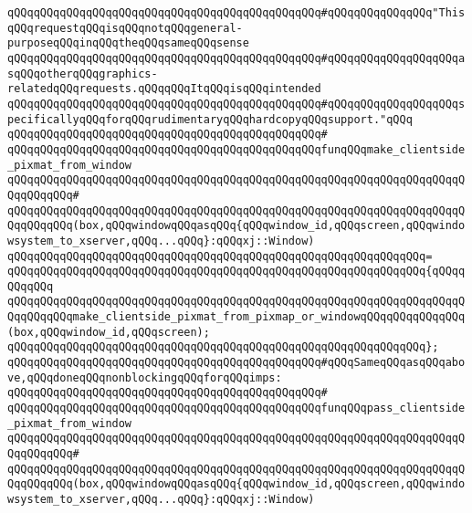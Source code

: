 \verb|qQQqqQQqqQQqqQQqqQQqqQQqqQQqqQQqqQQqqQQqqQQqqQQq#qQQqqQQqqQQqqQQq"ThisqQQqrequestqQQqisqQQqnotqQQqgeneral-purposeqQQqinqQQqtheqQQqsameqQQqsense|\newline
\verb|qQQqqQQqqQQqqQQqqQQqqQQqqQQqqQQqqQQqqQQqqQQqqQQq#qQQqqQQqqQQqqQQqqQQqasqQQqotherqQQqgraphics-relatedqQQqrequests.qQQqqQQqItqQQqisqQQqintended|\newline
\verb|qQQqqQQqqQQqqQQqqQQqqQQqqQQqqQQqqQQqqQQqqQQqqQQq#qQQqqQQqqQQqqQQqqQQqspecificallyqQQqforqQQqrudimentaryqQQqhardcopyqQQqsupport."qQQq|\newline
\verb|qQQqqQQqqQQqqQQqqQQqqQQqqQQqqQQqqQQqqQQqqQQqqQQq#|\newline
\verb|qQQqqQQqqQQqqQQqqQQqqQQqqQQqqQQqqQQqqQQqqQQqqQQqfunqQQqmake_clientside_pixmat_from_window|\newline
\verb|qQQqqQQqqQQqqQQqqQQqqQQqqQQqqQQqqQQqqQQqqQQqqQQqqQQqqQQqqQQqqQQqqQQqqQQqqQQqqQQq#|\newline
\verb|qQQqqQQqqQQqqQQqqQQqqQQqqQQqqQQqqQQqqQQqqQQqqQQqqQQqqQQqqQQqqQQqqQQqqQQqqQQqqQQq(box,qQQqwindowqQQqasqQQq{qQQqwindow_id,qQQqscreen,qQQqwindowsystem_to_xserver,qQQq...qQQq}:qQQqxj::Window)|\newline
\verb|qQQqqQQqqQQqqQQqqQQqqQQqqQQqqQQqqQQqqQQqqQQqqQQqqQQqqQQqqQQqqQQq=|\newline
\verb|qQQqqQQqqQQqqQQqqQQqqQQqqQQqqQQqqQQqqQQqqQQqqQQqqQQqqQQqqQQqqQQq{qQQqqQQqqQQq|\newline
\verb|qQQqqQQqqQQqqQQqqQQqqQQqqQQqqQQqqQQqqQQqqQQqqQQqqQQqqQQqqQQqqQQqqQQqqQQqqQQqqQQqmake_clientside_pixmat_from_pixmap_or_windowqQQqqQQqqQQqqQQq(box,qQQqwindow_id,qQQqscreen);|\newline
\verb|qQQqqQQqqQQqqQQqqQQqqQQqqQQqqQQqqQQqqQQqqQQqqQQqqQQqqQQqqQQqqQQq};|\newline
\newline
\verb|qQQqqQQqqQQqqQQqqQQqqQQqqQQqqQQqqQQqqQQqqQQqqQQq#qQQqSameqQQqasqQQqabove,qQQqdoneqQQqnonblockingqQQqforqQQqimps:|\newline
\verb|qQQqqQQqqQQqqQQqqQQqqQQqqQQqqQQqqQQqqQQqqQQqqQQq#|\newline
\verb|qQQqqQQqqQQqqQQqqQQqqQQqqQQqqQQqqQQqqQQqqQQqqQQqfunqQQqpass_clientside_pixmat_from_window|\newline
\verb|qQQqqQQqqQQqqQQqqQQqqQQqqQQqqQQqqQQqqQQqqQQqqQQqqQQqqQQqqQQqqQQqqQQqqQQqqQQqqQQq#|\newline
\verb|qQQqqQQqqQQqqQQqqQQqqQQqqQQqqQQqqQQqqQQqqQQqqQQqqQQqqQQqqQQqqQQqqQQqqQQqqQQqqQQq(box,qQQqwindowqQQqasqQQq{qQQqwindow_id,qQQqscreen,qQQqwindowsystem_to_xserver,qQQq...qQQq}:qQQqxj::Window)|\newline
